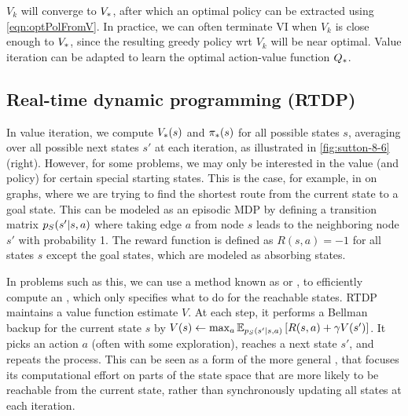 $V_k$ will converge to $\Vopt$,
after which an optimal policy can be extracted using \cref{eqn:optPolFromV}.
In practice, we can often terminate VI
when $V_k$ is close enough to $\Vopt$,
since the resulting greedy policy wrt $V_k$
will be near optimal.
Value iteration can be adapted to learn the optimal action-value function $\Qopt$.

\subsection{Real-time dynamic programming (RTDP)}
\label{sec:RTDP}


In value iteration, we compute $\Vopt(s)$ and $\polopt(s)$
for all possible states $s$,
averaging over all possible next states $s'$ at each iteration,
as illustrated in \cref{fig:sutton-8-6}(right).
However, for some problems,
we may only be interested in the value (and policy)
for certain special starting states.
This is the case, for example, in
 on graphs,
where we are trying to find the shortest
route from the current state to a goal state.
This can be modeled as an episodic MDP
by defining a transition matrix
$\ptran(s'|s,a)$ where
taking edge $a$ from node $s$ leads to the neighboring node $s'$
with probability 1.
The reward function is defined as $R(s,a)=-1$ for all states $s$
except the goal states,
which are modeled as absorbing
states.

In problems such as this, we can use a method
known as 
or  \citep{Barto1995},
to efficiently compute an ,
which only specifies what to do for the reachable states.
RTDP maintains a value function estimate $V$.
At each step, it performs a Bellman backup for the
current state $s$ by
$V(s) \assign \max_a \expectQ{R(s,a) + \gamma V(s')}{\ptran(s'|s,a)}$.
It picks an action $a$ (often with some exploration), reaches a next state $s'$,
and repeats the process.
This can be seen as a form of the more general
,
that focuses its computational effort on parts of the state
space that are more likely to be reachable from the current state,
rather than synchronously updating all states at each iteration.

